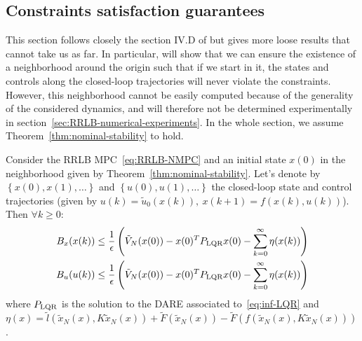 \documentclass[12pt]{article}
\begin{document}
\subsection{Constraints satisfaction guarantees}\label{sec:constraints-satisfaction-guarantees}
This section follows closely the section IV.D of \cite{RRLB-linear-MPC} but gives more loose results that cannot take us as far.
In particular, will show that we can ensure the existence of a neighborhood around the origin such that if we start in it, the states and controls along the closed-loop trajectories will never violate the constraints.
However, this neighborhood cannot be easily computed because of the generality of the considered dynamics, and will therefore not be determined experimentally in section~\ref{sec:RRLB-numerical-experiments}.
In the whole section, we assume Theorem~\ref{thm:nominal-stability} to hold.

\begin{lemma}
	\label{thm:RRLB-bounds-guarantees}
	Consider the RRLB MPC~\ref{eq:RRLB-NMPC} and an initial state $x(0)$ in the neighborhood given by Theorem~\ref{thm:nominal-stability}.
	Let's denote by $\left\{x(0),x(1),\ldots\right\}$ and $\left\{u(0), u(1),\ldots\right\}$ the closed-loop state and control trajectories (given by $u(k)=\tilde{u}_0(x(k)),~x(k+1)=f(x(k),u(k))$).
	Then $\forall k\geq 0$:
	\begin{align*}
		B_x(x(k))&\leq\frac{1}{\epsilon}\left(\tilde{V}_N(x(0))-x(0)^TP_{\rm{LQR}}x(0)-\sum_{k=0}^\infty\eta(x(k))\right)\\
		B_u(u(k))&\leq\frac{1}{\epsilon}\left(\tilde{V}_N(x(0))-x(0)^TP_{\rm{LQR}}x(0)-\sum_{k=0}^\infty\eta(x(k))\right)
	\end{align*}
	where $P_{\rm{LQR}}$ is the solution to the DARE associated to~\ref{eq:inf-LQR} and $\eta(x)=\tilde{l}(\tilde{x}_N(x),K\tilde{x}_N(x))+\tilde{F}(\tilde{x}_N(x))-\tilde{F}(f(\tilde{x}_N(x), K\tilde{x}_N(x)))$.
\end{lemma}
\end{document}
